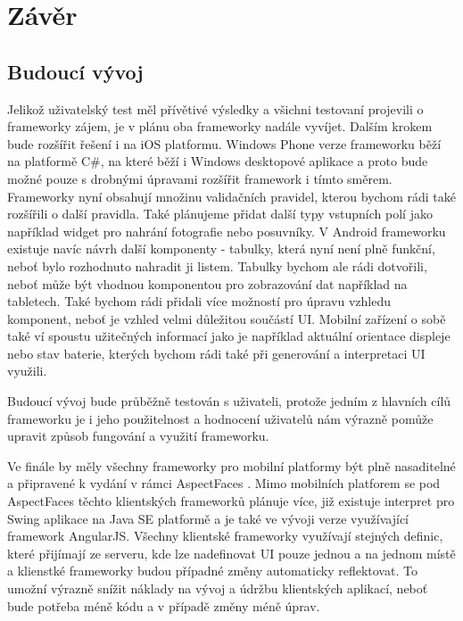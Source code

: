 \chapter{Závěr}
\section{Budoucí vývoj}
Jelikož uživatelský test měl přívětivé výsledky a všichni testovaní projevili o frameworky zájem, je v plánu oba frameworky nadále vyvíjet. Dalším krokem bude rozšířit řešení i na iOS platformu. Windows Phone verze frameworku běží na platformě C\#, na které běží i Windows desktopové aplikace a proto bude možné pouze s drobnými úpravami rozšířit framework i tímto směrem. Frameworky nyní obsahují množinu validačních pravidel, kterou bychom rádi také rozšířili o další pravidla. Také plánujeme přidat další typy vstupních polí jako například widget pro nahrání fotografie nebo posuvníky. V Android frameworku existuje navíc návrh další komponenty - tabulky, která nyní není plně funkční, neboť bylo rozhodnuto nahradit ji listem. Tabulky bychom ale rádi dotvořili, neboť může být vhodnou komponentou pro zobrazování dat například na tabletech. Také bychom rádi přidali více možností pro úpravu vzhledu komponent, neboť je vzhled velmi důležitou součástí UI. Mobilní zařízení o sobě také ví spoustu užitečných informací jako je například aktuální orientace displeje nebo stav baterie, kterých bychom rádi také při generování a interpretaci UI využili.

Budoucí vývoj bude průběžně testován s uživateli, protože jedním z hlavních cílů frameworku je i jeho použitelnost a hodnocení uživatelů nám výrazně pomůže upravit způsob fungování a využití frameworku.

Ve finále by měly všechny frameworky pro mobilní platformy být plně nasaditelné a připravené k vydání v rámci AspectFaces \cite{aspect-faces}. Mimo mobilních platforem se pod AspectFaces těchto klientských frameworků plánuje více, již existuje interpret pro Swing aplikace na Java SE platformě a je také ve vývoji verze využívající framework AngularJS. Všechny klientské frameworky využívají stejných definic, které přijímají ze serveru, kde lze nadefinovat UI pouze jednou a na jednom místě a klienstké frameworky budou případné změny automaticky reflektovat. To umožní výrazně snížit náklady na vývoj a údržbu klientských aplikací, neboť bude potřeba méně kódu a v případě změny méně úprav.

